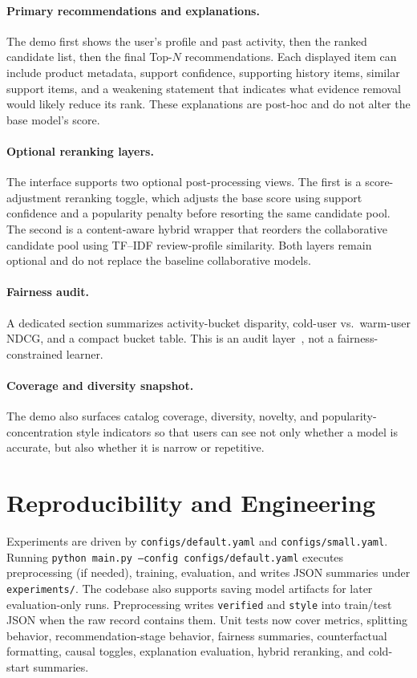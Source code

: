 \documentclass[sigconf,nonacm]{acmart}
\begin{document}
\paragraph{Primary recommendations and explanations.}
The demo first shows the user's profile and past activity, then the ranked candidate list, then the final Top-$N$ recommendations. Each displayed item can include product metadata, support confidence, supporting history items, similar support items, and a weakening statement that indicates what evidence removal would likely reduce its rank. These explanations are post-hoc and do not alter the base model's score.

\paragraph{Optional reranking layers.}
The interface supports two optional post-processing views. The first is a score-adjustment reranking toggle, which adjusts the base score using support confidence and a popularity penalty before resorting the same candidate pool. The second is a content-aware hybrid wrapper that reorders the collaborative candidate pool using TF--IDF review-profile similarity. Both layers remain optional and do not replace the baseline collaborative models.

\paragraph{Fairness audit.}
A dedicated section summarizes activity-bucket disparity, cold-user vs.\ warm-user NDCG, and a compact bucket table. This is an audit layer~\cite{li2021userfairness,burke2017multisided}, not a fairness-constrained learner.

\paragraph{Coverage and diversity snapshot.}
The demo also surfaces catalog coverage, diversity, novelty, and popularity-concentration style indicators so that users can see not only whether a model is accurate, but also whether it is narrow or repetitive.

\section{Reproducibility and Engineering}
Experiments are driven by \texttt{configs/default.yaml} and \texttt{configs/small.yaml}. Running \texttt{python main.py --config configs/default.yaml} executes preprocessing (if needed), training, evaluation, and writes JSON summaries under \texttt{experiments/}. The codebase also supports saving model artifacts for later evaluation-only runs. Preprocessing writes \texttt{verified} and \texttt{style} into train/test JSON when the raw record contains them. Unit tests now cover metrics, splitting behavior, recommendation-stage behavior, fairness summaries, counterfactual formatting, causal toggles, explanation evaluation, hybrid reranking, and cold-start summaries.
\end{document}
